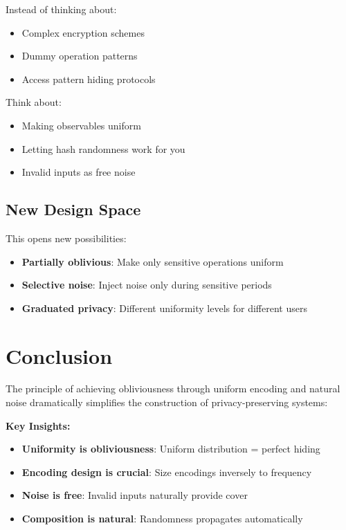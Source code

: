 \documentclass[11pt,final,hidelinks]{article}
\begin{document}
Instead of thinking about:
\begin{itemize}
    \item Complex encryption schemes
    \item Dummy operation patterns
    \item Access pattern hiding protocols
\end{itemize}

Think about:
\begin{itemize}
    \item Making observables uniform
    \item Letting hash randomness work for you
    \item Invalid inputs as free noise
\end{itemize}

\subsection{New Design Space}

This opens new possibilities:
\begin{itemize}
    \item \textbf{Partially oblivious}: Make only sensitive operations uniform
    \item \textbf{Selective noise}: Inject noise only during sensitive periods
    \item \textbf{Graduated privacy}: Different uniformity levels for different users
\end{itemize}

\section{Conclusion}

The principle of achieving obliviousness through uniform encoding and natural noise dramatically simplifies the construction of privacy-preserving systems:

\textbf{Key Insights:}
\begin{itemize}
    \item \textbf{Uniformity is obliviousness}: Uniform distribution = perfect hiding
    \item \textbf{Encoding design is crucial}: Size encodings inversely to frequency
    \item \textbf{Noise is free}: Invalid inputs naturally provide cover
    \item \textbf{Composition is natural}: Randomness propagates automatically
\end{itemize}
\end{document}
